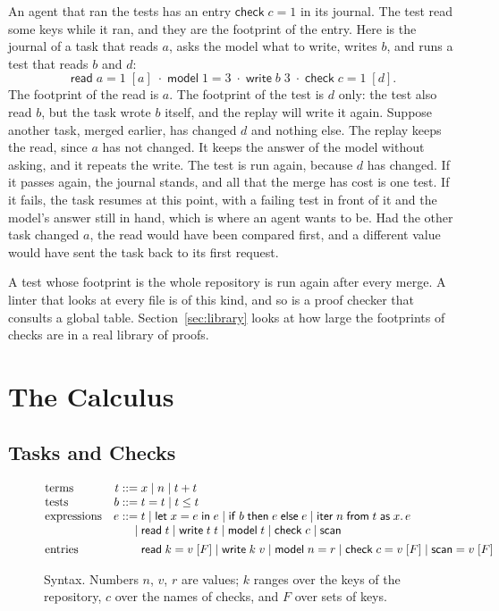 \documentclass[acmsmall,nonacm,screen]{acmart}
\newcommand{\kw}[1]{\mathsf{#1}}
\newcommand{\letin}[3]{\kw{let}\;#1 = #2\;\kw{in}\;#3}
\newcommand{\ite}[3]{\kw{if}\;#1\;\kw{then}\;#2\;\kw{else}\;#3}
\newcommand{\iter}[4]{\kw{iter}\;#1\;\kw{from}\;#2\;\kw{as}\;#3.\,#4}
\newcommand{\rd}[1]{\kw{read}\;#1}
\newcommand{\wrt}[2]{\kw{write}\;#1\;#2}
\newcommand{\mdl}[1]{\kw{model}\;#1}
\newcommand{\chk}[1]{\kw{check}\;#1}
\newcommand{\scan}{\kw{scan}}
\begin{document}
An agent that ran the tests has an entry $\chk{c} = 1$ in its journal. The test read some
keys while it ran, and they are the footprint of the entry. Here is the journal of a task
that reads $a$, asks the model what to write, writes $b$, and runs a test that reads $b$ and
$d$:
\[
\rd{a} = 1\;[a] \;\cdot\; \mdl{1} = 3 \;\cdot\; \wrt{b}{3} \;\cdot\; \chk{c} = 1\;[d].
\]
The footprint of the read is $a$. The footprint of the test is $d$ only: the test also read
$b$, but the task wrote $b$ itself, and the replay will write it again. Suppose another task,
merged earlier, has changed $d$ and nothing else. The replay keeps the read, since $a$ has
not changed. It keeps the answer of the model without asking, and it repeats the write. The
test is run again, because $d$ has changed. If it passes again, the journal stands, and all
that the merge has cost is one test. If it fails, the task resumes at this point, with a
failing test in front of it and the model's answer still in hand, which is where an agent
wants to be. Had the other task changed $a$, the read would have been compared first, and a
different value would have sent the task back to its first request.

A test whose footprint is the whole repository is run again after every merge. A linter
that looks at every file is of this kind, and so is a proof checker that consults a global
table. Section~\ref{sec:library} looks at how large the footprints of checks are in a real
library of proofs.

\section{The Calculus}
\label{sec:calculus}

\subsection{Tasks and Checks}

\begin{figure}[t]
\[
\begin{array}{@{}l@{\quad}r@{\;}l@{}}
\text{terms} & t ::= & x \mid n \mid t + t \\
\text{tests} & b ::= & t = t \mid t \le t \\
\text{expressions} & e ::= & t \mid \letin{x}{e}{e} \mid \ite{b}{e}{e} \mid \iter{n}{t}{x}{e} \\
 & \mid & \rd{t} \mid \wrt{t}{t} \mid \mdl{t} \mid \chk{c} \mid \scan \\[1ex]
\text{entries} & & \rd{k} = v\;[F] \mid \wrt{k}{v} \mid \mdl{n} = r \mid \chk{c} = v\;[F] \mid \scan = v\;[F]
\end{array}
\]
\caption{Syntax. Numbers $n$, $v$, $r$ are values; $k$ ranges over the keys of the
repository, $c$ over the names of checks, and $F$ over sets of keys.}
\label{fig:syntax}
\end{figure}
\end{document}
